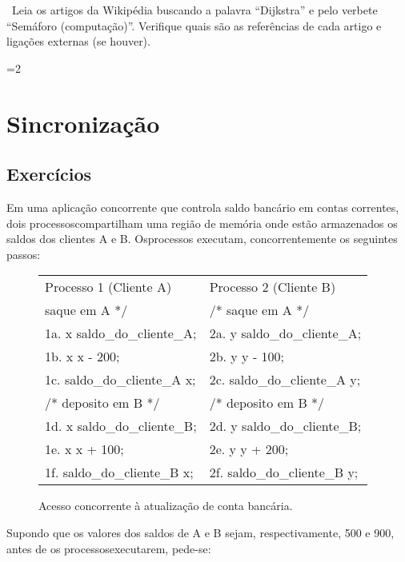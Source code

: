 
\exercise~Leia os artigos da Wikipédia buscando a palavra ``Dijkstra''
e pelo verbete ``Semáforo (computação)''. Verifique quais são as
referências de cada artigo e ligações externas (se houver).


=2

\section{Sincronização}
\subsection{Exercícios}

Em uma aplicação concorrente que controla saldo bancário em contas
correntes, dois processoscompartilham uma região de memória onde estão
armazenados os saldos dos clientes A e B. Osprocessos executam,
concorrentemente os seguintes passos: 

\begin{figure}[h]
\begin{tt}
\begin{tabular}{l|l}
Processo 1 (Cliente A) & Processo 2 (Cliente B) \\
\/\* saque em A */ & /* saque em A */ \\
1a. x \ra{} saldo\_do\_cliente\_A; & 2a. y \ra{} saldo\_do\_cliente\_A; \\
1b. x \ra{} x - 200; & 2b. y \ra{} y - 100;\\
1c. saldo\_do\_cliente\_A \ra{} x; & 2c. saldo\_do\_cliente\_A \ra{} y;\\
/* deposito em B */ & /* deposito em B */\\
1d. x \ra{} saldo\_do\_cliente\_B; & 2d. y \ra{} saldo\_do\_cliente\_B;\\
1e. x \ra{} x + 100; & 2e. y \ra{} y + 200;\\
1f. saldo\_do\_cliente\_B \ra{} x; & 2f. saldo\_do\_cliente\_B \ra{} y; \\
\end{tabular}
\end{tt}
\caption{Acesso concorrente à atualização de conta bancária.}
\end{figure}

Supondo que os valores dos saldos de A e B sejam, respectivamente, 500
e 900, antes de os processosexecutarem, pede-se:

